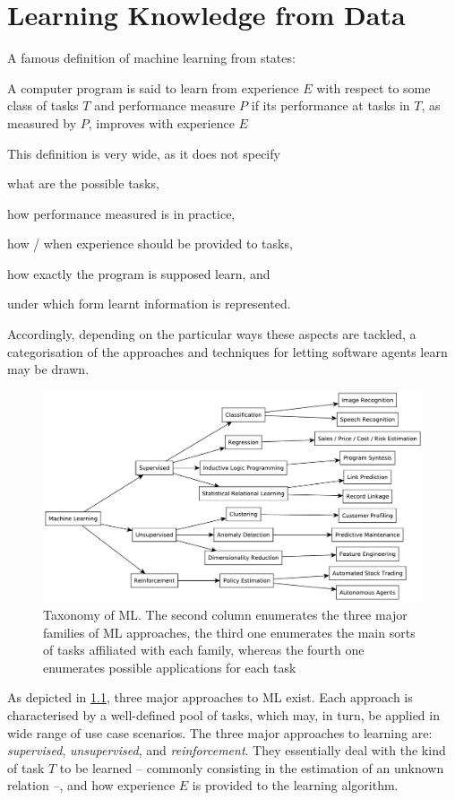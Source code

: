 \documentclass[12pt,a4paper,openright,twoside]{book}
\begin{document}
\chapter{Learning Knowledge from Data}
\label{chap:learning}

A famous definition of machine learning from \cite{Mitchell1997} states:
%
\begin{displayquote}
    A computer program is said to learn from experience $E$ with respect to some class of tasks $T$ and performance measure $P$ if its performance at tasks in $T$, as measured by $P$, improves with experience $E$
\end{displayquote}
%
This definition is very wide, as it does not specify
%
\begin{inlinelist}
    \item what are the possible tasks,
    \item how performance measured is in practice,
    \item how / when experience should be provided to tasks,
    \item how exactly the program is supposed learn, and
    \item under which form learnt information is represented.
\end{inlinelist}
%
Accordingly, depending on the particular ways these aspects are tackled, a categorisation of the approaches and techniques for letting software agents learn may be drawn.

\begin{figure}
    \centering
    \includegraphics[width=.8\linewidth]{figures/ml-taxonomy.pdf}
    \caption[Taxonomy of ML]{Taxonomy of ML. The second column enumerates the three major families of ML approaches, the third one enumerates the main sorts of tasks affiliated with each family, whereas the fourth one enumerates possible applications for each task}
    \label{fig:ml-taxonomy}
\end{figure}
%
As depicted in \cref{fig:ml-taxonomy}, three major approaches to ML exist.
%
Each approach is characterised by a well-defined pool of tasks, which may, in turn, be applied in wide range of use case scenarios.
%
The three major approaches to learning are: \emph{supervised}, \emph{unsupervised}, and \emph{reinforcement}.
%
They essentially deal with the kind of task $T$ to be learned -- commonly consisting in the estimation of an unknown relation --, and how experience $E$ is provided to the learning algorithm.
\end{document}
